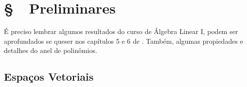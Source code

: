 \section*{\S \ \ Preliminares}

É preciso lembrar algumos resultados do curso de Álgebra Linear I, podem ser aprofundados se queser nos capítulos 5 e 6 de \cite{MA719}. Também, algumas propiedades e detalhes do anel de polinômios.  



\subsection*{Espaços Vetoriais}

